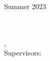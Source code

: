 \begin{titlepage}
\begin{center}
\begin{normalsize}
\begin{flushleft}
		\vspace{30pt}
		\centering
		Summer 2023

	\end{flushleft}
	\end{normalsize}
	
	\end{center}
	\vspace*{\fill}
	\singlespacing
	\cleardoublepage


	\vfill
\end{titlepage}


\hfill
\vfill
{
	\small
	\textbf{\thesisName} \\
	\textit{\thesisTitle} \\
	\thesisSubject, \thesisDate \\
	Supervisors: \thesisFirstSupervisor\ \\[1.5em]
	\textbf{\thesisUniversity} \\
	\textit{\thesisUniversityGroup} \\
	\thesisUniversityDepartment \\
	\thesisUniversityCity
}
